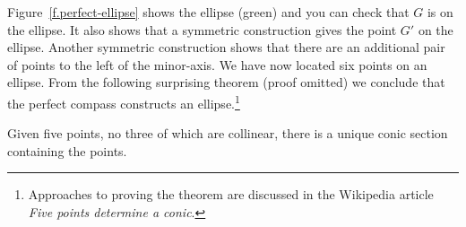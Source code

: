 Figure~\ref{f.perfect-ellipse} shows the ellipse (green) and you can check that $G$ is on the ellipse. It also shows that a symmetric construction gives the point $G'$ on the ellipse. Another symmetric construction shows that there are an additional pair of points to the left of the minor-axis.  We have now located six points on an ellipse. From the following surprising theorem (proof omitted) we conclude that the perfect compass constructs an ellipse.\footnote{Approaches to proving the theorem are discussed in the Wikipedia article \emph{Five points determine a conic}.}

\begin{theorem}
Given five points, no three of which are collinear, there is a unique conic section containing the points.
\end{theorem}




